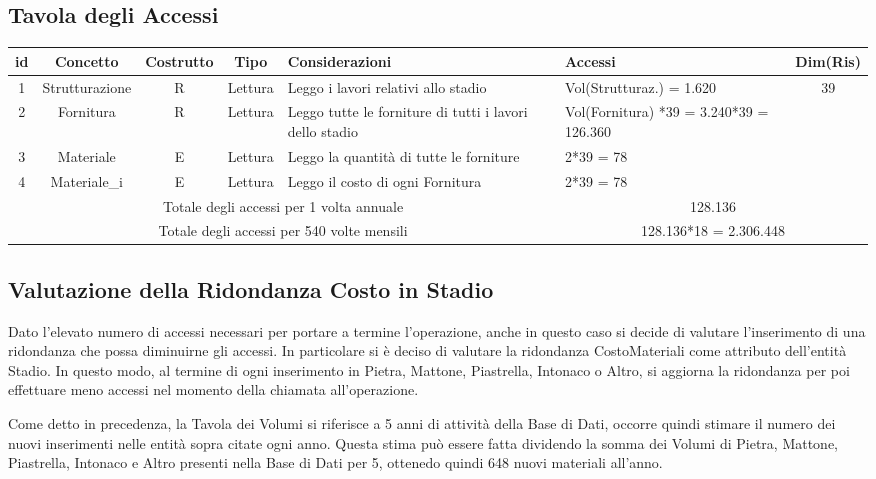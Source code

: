 \documentclass[12pt,a4paper]{report}
\begin{document}
            \subsection{Tavola degli Accessi}
            \begin{tabular}{|c|c|c|c|p{4cm}|p{3cm}|c|}
                \hline
                \textbf{id} & \textbf{Concetto} & \textbf{Costrutto} & \textbf{Tipo} & \textbf{Considerazioni} & \textbf{Accessi} & \textbf{Dim(Ris)} \\ \hline
                1 & Strutturazione & R & Lettura & Leggo i lavori relativi allo stadio & Vol(Strutturaz.) = 1.620 & 39 \\ \hline
                2 & Fornitura & R & Lettura & Leggo tutte le forniture di tutti i lavori dello stadio & Vol(Fornitura) *39 = 3.240*39 = 126.360 & ~ \\ \hline
                3 & Materiale & E & Lettura & Leggo la quantità di tutte le forniture & 2*39 = 78 & ~ \\ \hline
                4 & Materiale\_i & E & Lettura & Leggo il costo di ogni Fornitura & 2*39 = 78 & ~ \\ \hline
                \multicolumn{5}{|c|}{Totale degli accessi per 1 volta annuale} & \multicolumn{2}{|c|}{128.136} \\ \hline
                \multicolumn{5}{|c|}{Totale degli accessi per 540 volte mensili} & \multicolumn{2}{|c|}{128.136*18 = 2.306.448} \\ \hline
            \end{tabular}

            \subsection{Valutazione della Ridondanza Costo in Stadio}
                Dato l'elevato numero di accessi necessari per portare a termine l'operazione, anche in questo caso si decide di valutare l'inserimento di una ridondanza che possa diminuirne gli accessi. In particolare si è deciso di valutare la ridondanza CostoMateriali come attributo dell'entità Stadio. In questo modo, al termine di ogni inserimento in Pietra, Mattone, Piastrella, Intonaco o Altro, si aggiorna la ridondanza per poi effettuare meno accessi nel momento della chiamata all'operazione.

                Come detto in precedenza, la Tavola dei Volumi si riferisce a 5 anni di attività della Base di Dati, occorre quindi stimare il numero dei nuovi inserimenti nelle entità sopra citate ogni anno. Questa stima può essere fatta dividendo la somma dei Volumi di Pietra, Mattone, Piastrella, Intonaco e Altro presenti nella Base di Dati per 5, ottenedo quindi 648 nuovi materiali all'anno.
\end{document}
